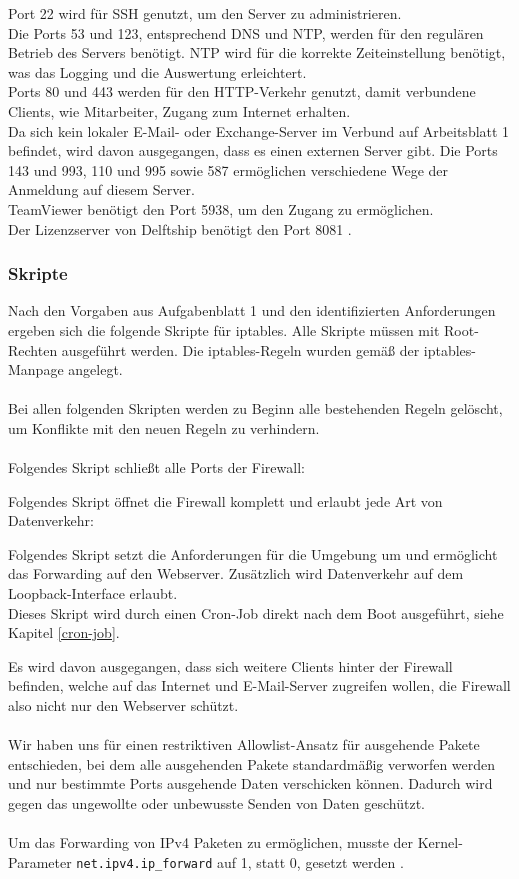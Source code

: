\documentclass[
    a4paper,
    pagesize,
	pdftex,
    12pt,
]{scrartcl}
\begin{document}
Port 22 wird für SSH genutzt, um den Server zu administrieren. \\
Die Ports 53 und 123, entsprechend DNS und NTP, werden für den regulären Betrieb des Servers benötigt. NTP wird für die korrekte Zeiteinstellung benötigt, was das Logging und die Auswertung erleichtert. \\
Ports 80 und 443 werden für den HTTP-Verkehr genutzt, damit verbundene Clients, wie Mitarbeiter, Zugang zum Internet erhalten. \\
Da sich kein lokaler E-Mail- oder Exchange-Server im Verbund auf Arbeitsblatt 1 befindet, wird davon ausgegangen, dass es einen externen Server gibt. Die Ports 143 und 993, 110 und 995 sowie 587 ermöglichen verschiedene Wege der Anmeldung auf diesem Server. \\
TeamViewer benötigt den Port 5938, um den Zugang zu ermöglichen. \\
Der Lizenzserver von Delftship benötigt den Port 8081 \cite{delftship}.

\subsubsection{Skripte}
Nach den Vorgaben aus Aufgabenblatt 1 und den identifizierten Anforderungen ergeben sich die folgende Skripte für iptables. Alle Skripte müssen mit Root-Rechten ausgeführt werden. Die iptables-Regeln wurden gemäß der iptables-Manpage \cite{iptables-manpage} angelegt. \\ \\ 
Bei allen folgenden Skripten werden zu Beginn alle bestehenden Regeln gelöscht, um Konflikte mit den neuen Regeln zu verhindern. \\ \\
Folgendes Skript schließt alle Ports der Firewall:

Folgendes Skript öffnet die Firewall komplett und erlaubt jede Art von Datenverkehr:

Folgendes Skript setzt die Anforderungen für die Umgebung um und ermöglicht das Forwarding auf den Webserver. Zusätzlich  wird  Datenverkehr auf dem Loopback-Interface erlaubt. \\
Dieses Skript wird durch einen Cron-Job direkt nach dem Boot ausgeführt, siehe Kapitel \ref{cron-job}.

Es wird davon ausgegangen, dass sich weitere Clients hinter der Firewall befinden, welche auf das Internet und E-Mail-Server zugreifen wollen, die Firewall also nicht nur den Webserver schützt.
\\ \\
Wir haben uns für einen restriktiven Allowlist-Ansatz \cite{allowlist} für ausgehende Pakete entschieden, bei dem alle ausgehenden Pakete standardmäßig verworfen werden und nur bestimmte Ports ausgehende Daten verschicken können. Dadurch wird gegen das ungewollte oder unbewusste Senden von Daten geschützt.
\\ \\
Um das Forwarding von IPv4 Paketen zu ermöglichen, musste der Kernel-Parameter \lstinline[breaklines]|net.ipv4.ip_forward| auf 1, statt 0, gesetzt werden \cite{ipv4forward-kernel}. 
\end{document}
